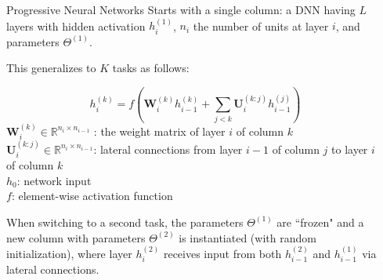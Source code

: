 \documentclass[final, hyperref={pdfpagelabels=false}]{beamer}
\begin{document}
\begin{frame}{}
\begin{columns}[t]
\begin{column}{.30\linewidth}
    \begin{block}{Progressive Neural Networks \cite{rusu2016progressive}}
        Starts with a single column: a DNN having $L$ layers with hidden activation $h_i^{(1)}$,  $n_i$ the number of units at layer $i$, and parameters $\Theta^{(1)}$. 
    
        This generalizes to $K$ tasks as follows:
    
        $$h_i^{(k)} = f(\mathbf{W}_i^{(k)}h_{i-1}^{(k)} + \sum_{j<k}\mathbf{U}_i^{(k:j)}h_{i-1}^{(j)})$$
        {\footnotesize
        $\mathbf{W}_{i}^{(k)} \in \mathbb{R}^{n_i \times n_{i-1}}$ : the weight matrix of layer $i$ of column $k$ \\
        $\mathbf{U}_i^{(k:j)} \in \mathbb{R}^{n_i \times n_{i-1}}$: lateral connections from layer $i-1$ of column $j$ to layer $i$ of column $k$ \\
        $h_0$: network input \\
        $f$: element-wise activation function}  
        
        When switching to a second task, the parameters $\Theta^{(1)}$ are ``frozen" and a new column with parameters $\Theta^{(2)}$ is instantiated (with random initialization), where layer $h_i^{(2)}$ receives input from both $h_{i-1}^{(2)}$ and $h_{i-1}^{(1)}$ via lateral connections. 
    \end{block}

    \end{column}

    \begin{column}{.30\linewidth}
        
        
    

\end{column}
\end{columns}
\end{frame}
\end{document}
